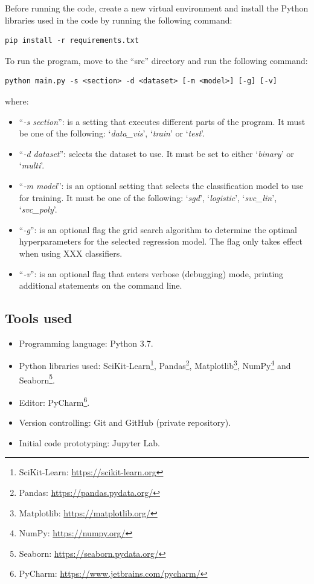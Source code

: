 \documentclass[letterpaper,12pt]{article}
\begin{document}
Before running the code, create a new virtual environment and install the Python libraries used in the code by running the following command:

\begin{lstlisting}
pip install -r requirements.txt
\end{lstlisting}

To run the program, move to the “src” directory and run the following command:

\begin{lstlisting}
python main.py -s <section> -d <dataset> [-m <model>] [-g] [-v]
\end{lstlisting}

where:
\begin{itemize}
    \item``\textit{-s section}'': is a setting that executes different parts of the program. It must be one of the following: `\textit{data\_vis}', `\textit{train}' or `\textit{test}'.
    \item``\textit{-d dataset}'': selects the dataset to use. It must be set to either `\textit{binary}' or `\textit{multi}'.
    \item``\textit{-m model}'': is an optional setting that selects the classification model to use for training. It must be one of the following: `\textit{sgd}', `\textit{logistic}', `\textit{svc\_lin}', `\textit{svc\_poly}'.
    \item``\textit{-g}'': is an optional flag the grid search algorithm to determine the optimal hyperparameters for the selected regression model. The flag only takes effect when using XXX classifiers.
    \item``\textit{-v}'': is an optional flag that enters verbose (debugging) mode, printing additional statements on the command line.
\end{itemize}

\subsection{Tools used}

\begin{itemize}
    \item Programming language: Python 3.7.
    \item Python libraries used: SciKit-Learn\footnote{SciKit-Learn: \url{https://scikit-learn.org}}, Pandas\footnote{Pandas: \url{https://pandas.pydata.org/}}, Matplotlib\footnote{Matplotlib: \url{https://matplotlib.org/}}, NumPy\footnote{NumPy: \url{https://numpy.org/}} and Seaborn\footnote{Seaborn: \url{https://seaborn.pydata.org/}}.
    \item Editor: PyCharm\footnote{PyCharm: \url{https://www.jetbrains.com/pycharm/}}.
    \item Version controlling: Git and GitHub (private repository).
    \item Initial code prototyping: Jupyter Lab.
\end{itemize}
\end{document}
